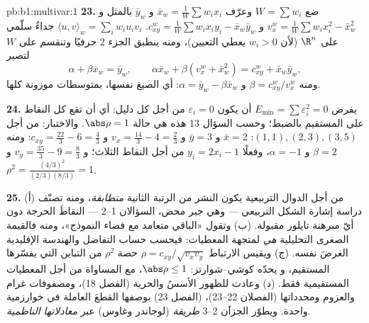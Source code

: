 \begin{solution}{pb:b1:multivar:1}
\textbf{23.} ضع $W = \sum w_i$ وعرّف $\bar x_w =
\frac1W\sum w_ix_i$ و $\bar y_w$ بالمثل و $v_x^w = \frac1W\sum
w_ix_i^2 - \bar x_w^2$ و $c^w_{xy} = \frac1W\sum w_ix_iy_i - \bar
x_w\bar y_w$.  $\langle u, v\rangle_w = \sum_i w_iu_iv_i$
جداءٌ سلّمي على $\R^n$ (لأن $w_i > 0$ يعطي التعيين)، ومنه
ينطبق الجزء 2 حرفيًا وتنقسم  على $W$
لتصير
\[
\alpha + \beta\bar x_w = \bar y_w,
\qquad
\alpha\bar x_w + \beta(v^w_x + \bar x_w^2) = c^w_{xy} + \bar
x_w\bar y_w ,
\]
ومنه $\beta = c^w_{xy}/v^w_x$ و $\alpha = \bar y_w -
\beta\bar x_w$: أي الصيغ نفسها، بمتوسطات موزونة كلها.

\textbf{24.} يفرض $E_{\min} = \sum\varepsilon_i^2 = 0$ أن يكون $\varepsilon_i = 0$ من أجل كل دليل: أي أن تقع كل النقاط على المستقيم بالضبط؛ وحسب السؤال
13 هذه هي حالة $\abs\rho = 1$. والاختبار: من أجل $(1,1), (2,3),
(3,5)$: $\bar x = 2$ و $\bar y = 3$ و $v_x = \frac{14}3 - 4 =
\frac23$ و $c_{xy} = \frac{22}3 - 6 = \frac43$: ومنه $\beta = 2$ و
$\alpha = -1$، وفعلًا $y_i = 2x_i - 1$ من أجل النقاط الثلاث؛
و $v_y = \frac{35}3 - 9 = \frac83$ و $\rho^2 =
\frac{(4/3)^2}{(2/3)(8/3)} = 1$.

\textbf{25.} (أ) من أجل الدوال التربيعية يكون النشر من الرتبة الثانية
\emph{متطابقة}، ومنه تصنّف دراسة إشارة الشكل التربيعي
--- وهي جبر محض، السؤالان 1--2 --- النقاطَ الحرجة
دون أيّ مبرهنة تايلور مقبولة. (ب) وتقول 
«الباقي متعامد مع فضاء النموذج»، ومنه فالقيمة الصغرى
التحليلية \emph{هي}  لمتجهة المعطيات:
فيحسب حساب التفاضل والهندسة الإقليدية الغرضَ نفسه. (ج)
ويقيس الارتباط $\rho = c_{xy}/\sqrt{v_xv_y}$ حصة
$\rho^2$ من التباين التي يفسّرها المستقيم، و
يحدّه كوشي--شوارتز: $\abs\rho \leq 1$، مع المساواة
من أجل المعطيات المستقيمية فقط. (د) وعادت للظهور الأسسُ والحرية (الفصل 18)،
ومصفوفات غرام والعزوم ومحدداتها (الفصلان 22--23)،
 (الفصل 23) بوصفها القطعَ العاملة
في خوارزمية واحدة. ويطوّر الجزآن 2--3
\emph{طريقة } (لوجاندر وغاوس) عبر
\emph{معادلاتها الناظمية}.
\end{solution}
